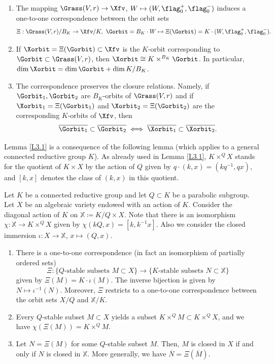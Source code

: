 \begin{lemma}
\label{L3.1}
\begin{enumerate}
\item The mapping $\Grass(V,r)\to\Xfv$, $W\mapsto (W,\flag_0^+,\flag_0^-)$ induces a one-to-one correspondence between the orbit sets
\[\Xi:\Grass(V,r)/B_K\to \Xfv/K,\ \Gorbit=B_K\cdot W\mapsto \Xi(\Gorbit)=K\cdot (W,\flag_0^+,\flag_0^-).\]
\item If $\Xorbit=\Xi(\Gorbit)\subset\Xfv$ is the $K$-orbit corresponding to $\Gorbit\subset\Grass(V,r)$, then $\Xorbit\cong K\times^{B_K}\Gorbit$. In particular, $\dim\Xorbit=\dim\Gorbit+\dim K/B_K$.
\item The correspondence preserves the closure relations. Namely, if $\Gorbit_1,\Gorbit_2$ are $B_K$-orbits of $\Grass(V,r)$ and if $\Xorbit_1=\Xi(\Gorbit_1)$ and $\Xorbit_2=\Xi(\Gorbit_2)$ are the corresponding $K$-orbits of $\Xfv$, then
\[\overline{\Gorbit_1}\subset\overline{\Gorbit_2}\iff \overline{\Xorbit_1}\subset\overline{\Xorbit_2}.\]
\end{enumerate}
\end{lemma}

Lemma \ref{L3.1} is a consequence of the following lemma (which applies to a general connected reductive group $K$).
As already used in Lemma \ref{L3.1}, $K\times^QX$ stands for the quotient of $K\times X$ by the action of $Q$ given by $q\cdot(k,x)=(kq^{-1},qx)$, and $[k,x]$ denotes the class of $(k,x)$ in this quotient. %

\begin{lemma}
\label{L3.2-new}
Let $K$ be a connected reductive group and let $Q\subset K$ be a parabolic subgroup. Let $X$ be an algebraic variety endowed with an action of $K$. Consider the diagonal action of $K$ on $\mathbb{X}\coloneqq K/Q\times X$.
Note that there is an isomorphism  $\chi:\mathbb{X}\to K\times^QX$ given by $\chi(kQ,x)=[k,k^{-1}x]$.
Also we consider the closed immersion $\iota:X\to\mathbb{X}$, $x\mapsto(Q,x)$.
\begin{enumerate}
\item There is a one-to-one correspondence (in fact an isomorphism of partially ordered sets)
\[\Xi:\{\mbox{$Q$-stable subsets $M\subset X$}\}\to\{\mbox{$K$-stable subsets $N\subset\mathbb{X}$}\}\]
given by $\Xi(M)=K\cdot\iota(M)$. The inverse bijection is given by $N\mapsto\iota^{-1}(N)$. Moreover, $\Xi$ restricts to a one-to-one correspondence between the orbit sets $X/Q$ and $\mathbb{X}/K$.
\item Every $Q$-stable subset $M\subset X$ yields a subset $K\times^QM\subset K\times^QX$, and we have $\chi(\Xi(M))=K\times^QM$.
\item Let $N=\Xi(M)$ for some $Q$-stable subset $M$. Then, $M$ is closed in $X$ if and only if $N$ is closed in $\mathbb{X}$. More generally, we have $\overline{N}=\Xi(\overline{M})$.
\end{enumerate}
\end{lemma}

